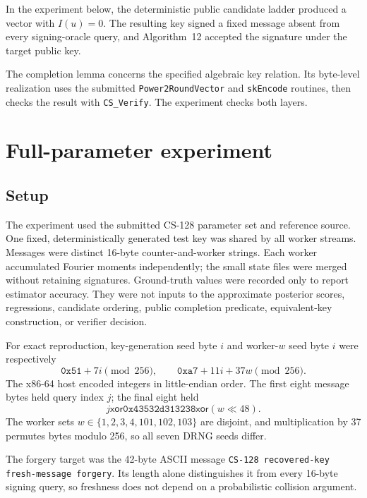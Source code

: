 \documentclass[11pt]{article}
\begin{document}
In the experiment below, the deterministic public candidate ladder produced a vector with
$I(u)=0$.  The resulting key signed a fixed message absent from every signing-oracle query,
and Algorithm~12 accepted the signature under the target public key.

The completion lemma concerns the specified algebraic key relation.  Its byte-level realization
uses the submitted \texttt{Power2RoundVector} and \texttt{skEncode} routines, then checks the
result with \texttt{CS\_Verify}.  The experiment checks both layers.

\section{Full-parameter experiment}
\label{sec:experiment}

\subsection{Setup}

The experiment used the submitted CS-128 parameter set and reference source.  One fixed,
deterministically generated test key was shared by all worker streams.  Messages were distinct
16-byte counter-and-worker strings.  Each worker accumulated Fourier moments independently;
the small state files were merged without retaining signatures.  Ground-truth values were recorded only to
report estimator accuracy.  They were not inputs to the approximate posterior scores,
regressions, candidate ordering, public completion predicate, equivalent-key construction, or
verifier decision.

For exact reproduction, key-generation seed byte $i$ and worker-$w$ seed byte $i$ were
respectively
\[
 \mathtt{0x51}+7i\pmod {256},\qquad
 \mathtt{0xa7}+11i+37w\pmod {256}.
\]
The x86-64 host encoded integers in little-endian order.  The first eight message bytes held
query index $j$; the final eight held
\[
j\mathbin{\mathsf{xor}}\mathtt{0x43532d313238}\mathbin{\mathsf{xor}}(w\ll48).
\]
The worker sets $w\in\{1,2,3,4,101,102,103\}$ are disjoint, and multiplication
by 37 permutes bytes modulo 256, so all seven DRNG seeds differ.

The forgery target was the 42-byte ASCII message
\texttt{CS-128 recovered-key fresh-message forgery}.  Its length alone distinguishes it from
every 16-byte signing query, so freshness does not depend on a probabilistic collision argument.
\end{document}
